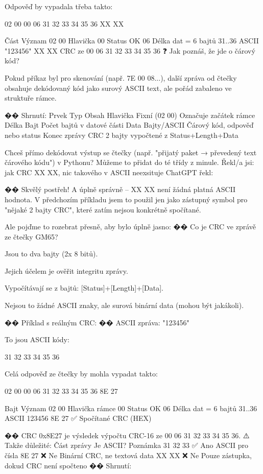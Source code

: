Odpověď by vypadala třeba takto:

02 00 00 06 31 32 33 34 35 36 XX XX

Část	Význam
02 00	Hlavička
00	Status OK
06	Délka dat = 6 bajtů
31..36	ASCII "123456"
XX XX	CRC ze 00 06 31 32 33 34 35 36
❓ Jak poznáš, že jde o čárový kód?

    Pokud příkaz byl pro skenování (např. 7E 00 08...), další zpráva od čtečky obsahuje dekódovaný kód jako surový ASCII text, ale pořád zabaleno ve struktuře rámce.

�� Shrnutí:
Prvek	Typ	Obsah
Hlavička	Fixní (02 00)	Označuje začátek rámce
Délka	Bajt	Počet bajtů v datové části
Data	Bajty/ASCII	Čárový kód, odpověď nebo status
Konec zprávy	CRC	2 bajty vypočtené z Status+Length+Data

Chceš přímo dekódovat výstup se čtečky (např. "přijatý paket → převedený text čárového kódu") v Pythonu? Můžeme to přidat do té třídy z minule.
Řekl/a jsi:
jak CRC XX XX, nic takového v ASCII neexsituje
ChatGPT řekl:

�� Skvělý postřeh! A úplně správně – XX XX není žádná platná ASCII hodnota. V předchozím příkladu jsem to použil jen jako zástupný symbol pro "nějaké 2 bajty CRC", které zatím nejsou konkrétně spočítané.

Ale pojďme to rozebrat přesně, aby bylo úplně jasno:
�� Co je CRC ve zprávě ze čtečky GM65?

    Jsou to dva bajty (2x 8 bitů).

    Jejich účelem je ověřit integritu zprávy.

    Vypočítávají se z bajtů: [Status]+[Length]+[Data].

    Nejsou to žádné ASCII znaky, ale surová binární data (mohou být jakákoli).

�� Příklad s reálným CRC:
�� ASCII zpráva: "123456"

To jsou ASCII kódy:

31 32 33 34 35 36

Celá odpověď ze čtečky by mohla vypadat takto:

02 00 00 06 31 32 33 34 35 36 8E 27

Bajt	Význam
02 00	Hlavička rámce
00	Status OK
06	Délka dat = 6 bajtů
31..36	ASCII 123456
8E 27	✅ Spočítané CRC (HEX)

�� CRC 0x8E27 je výsledek výpočtu CRC-16 ze 00 06 31 32 33 34 35 36.
⚠️ Takže důležité:
Část zprávy	Je ASCII?	Poznámka
31 32 33	✅ Ano	ASCII pro čísla
8E 27	❌ Ne	Binární CRC, ne textová data
XX XX	❌ Ne	Pouze zástupka, dokud CRC není spočteno
�� Shrnutí:

